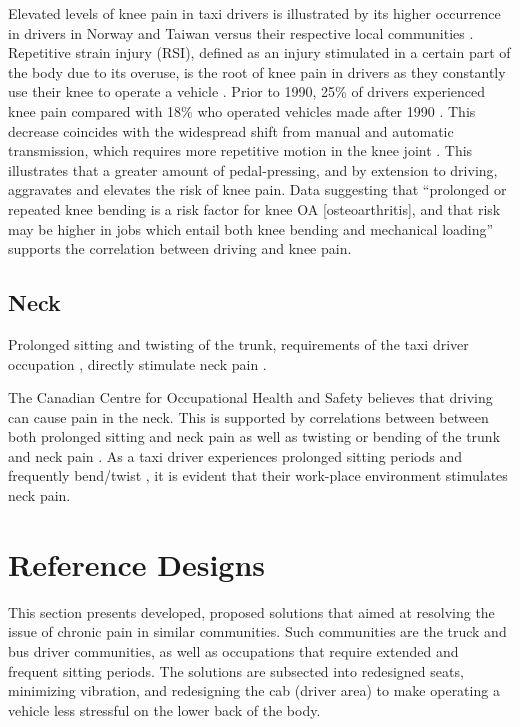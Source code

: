 \documentclass[11pt]{article}
\begin{document}
Elevated levels of knee pain in taxi drivers is illustrated by its higher occurrence in drivers 
in Norway and Taiwan versus their respective local communities \cite{KneePain}. Repetitive strain 
injury (RSI), defined as an injury stimulated in a certain part of the body due to its overuse, is the 
root of knee pain in drivers \cite{RSI} as they constantly use their knee to operate a vehicle 
\cite{KneePain}. Prior to 1990, 25\% of drivers experienced knee pain compared with 18\% who 
operated vehicles made after 1990 \cite{KneePain}. This decrease coincides with the widespread shift from 
manual and automatic transmission, which requires more repetitive motion in the knee joint 
\cite{KneePain}. This illustrates that a greater amount of pedal-pressing, and by extension to 
driving, aggravates and elevates the risk of knee pain. Data suggesting that “prolonged or repeated 
knee bending is a risk factor for knee OA [osteoarthritis], and that risk may be higher in jobs which 
entail both knee bending and mechanical loading” \cite{Osteoarthritis} supports the correlation 
between driving and knee pain.



\subsection{Neck}
Prolonged sitting and twisting of the trunk, requirements of the taxi driver occupation \cite{neck}, 
directly stimulate neck pain \cite{neck}. 

The Canadian Centre for Occupational Health and Safety believes that driving can cause pain in the 
neck\cite{proof}. This is supported by correlations between between both prolonged sitting and neck pain as well as  
twisting or bending of the trunk and neck pain \cite{neck}. 
As a taxi driver experiences prolonged sitting periods and frequently bend/twist \cite{Okunribido2008, POSTUALTED},
it is evident that their work-place environment stimulates neck pain. 

\section{Reference Designs}
\label{sec:designs}

This section presents developed, proposed solutions that aimed at resolving the issue of
chronic pain in similar communities. Such communities are the truck and bus driver communities, as well as occupations 
that require extended and frequent sitting periods. The solutions are subsected into
redesigned seats, minimizing vibration, and redesigning the cab (driver area) to make operating a vehicle
less stressful on the lower back of the body.
\end{document}
